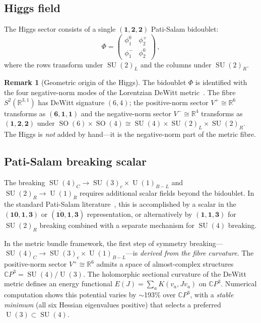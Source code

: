 \documentclass[12pt,a4paper]{article}
\theoremstyle{definition}
\newtheorem{remark}[theorem]{Remark}
\newcommand{\SO}{\operatorname{SO}}
\newcommand{\SU}{\operatorname{SU}}
\newcommand{\U}{\operatorname{U}}
\newcommand{\CP}{\mathbb{C}P}
\newcommand{\R}{\mathbb{R}}
\begin{document}
\subsection{Higgs field}

The Higgs sector consists of a single $(\mathbf{1}, \mathbf{2}, \mathbf{2})$ Pati-Salam bidoublet:
\begin{equation}
\label{eq:higgs_bidoublet}
\Phi = \begin{pmatrix} \phi^0_1 & \phi^+_2 \\ \phi^-_1 & \phi^0_2 \end{pmatrix}\,,
\end{equation}
where the rows transform under $\SU(2)_L$ and the columns under $\SU(2)_R$.

\begin{remark}[Geometric origin of the Higgs]
The bidoublet $\Phi$ is identified with the four negative-norm modes of the Lorentzian DeWitt metric~\cite{Paper1}.
The fibre $S^2(\R^{3,1})$ has DeWitt signature $(6,4)$; the positive-norm sector $V^+ \cong \R^6$ transforms as $(\mathbf{6},\mathbf{1},\mathbf{1})$ and the negative-norm sector $V^- \cong \R^4$ transforms as $(\mathbf{1},\mathbf{2},\mathbf{2})$ under $\SO(6) \times \SO(4) \cong \SU(4) \times \SU(2)_L \times \SU(2)_R$.
The Higgs is \emph{not} added by hand---it is the negative-norm part of the metric fibre.
\end{remark}

\subsection{Pati-Salam breaking scalar}

The breaking $\SU(4)_C \to \SU(3)_c \times \U(1)_{B-L}$ and $\SU(2)_R \to \U(1)_R$ requires additional scalar fields beyond the bidoublet.
In the standard Pati-Salam literature~\cite{MohapatraPati1975}, this is accomplished by a scalar in the $(\mathbf{10},\mathbf{1},\mathbf{3})$ or $(\overline{\mathbf{10}},\mathbf{1},\mathbf{3})$ representation, or alternatively by $(\mathbf{1},\mathbf{1},\mathbf{3})$ for $\SU(2)_R$ breaking combined with a separate mechanism for $\SU(4)$ breaking.

In the metric bundle framework, the first step of symmetry breaking---$\SU(4)_C \to \SU(3)_c \times \U(1)_{B-L}$---is \emph{derived from the fibre curvature}.
The positive-norm sector $V^+ \cong \R^6$ admits a space of almost-complex structures $\CP^3 = \SU(4)/\U(3)$.
The holomorphic sectional curvature of the DeWitt metric defines an energy functional $E(J) = \sum_a K(v_a, Jv_a)$ on $\CP^3$.
Numerical computation shows this potential varies by $\sim$193\% over $\CP^3$, with a \emph{stable minimum} (all six Hessian eigenvalues positive) that selects a preferred $\U(3) \subset \SU(4)$.
\end{document}
